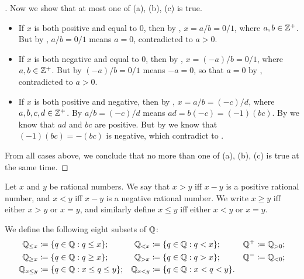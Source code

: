 \begin{proof}[]
  Now we show that at most one of (a), (b), (c) is true.
  \begin{itemize}
    \item If \(x\) is both positive and equal to \(0\), then by , \(x = a / b = 0 / 1\), where \(a, b \in \mathbb{Z}^+\).
          But by , \(a / b = 0 / 1\) means \(a = 0\), contradicted to \(a > 0\).
    \item If \(x\) is both negative and equal to \(0\), then by , \(x = (-a) / b = 0 / 1\), where \(a, b \in \mathbb{Z}^+\).
          But by  \((-a) / b = 0 / 1\) means \(-a = 0\), so that \(a = 0\) by , contradicted to \(a > 0\).
    \item If \(x\) is both positive and negative, then by , \(x = a / b = (-c) / d\), where \(a, b, c, d \in \mathbb{Z}^+\).
          By  \(a / b = (-c) / d\) means \(ad = b(-c) = (-1)(bc)\).
          By  we know that \(ad\) and \(bc\) are positive.
          But by  we know that \((-1)(bc) = -(bc)\) is negative, which contradict to .
  \end{itemize}
  From all cases above, we conclude that no more than one of (a), (b), (c) is true at the same time.
\end{proof}

\begin{defn}\label{i:4.2.8}
  Let \(x\) and \(y\) be rational numbers.
  We say that \(x > y\) iff \(x - y\) is a positive rational number, and \(x < y\) iff \(x - y\) is a negative rational number.
  We write \(x \geq y\) iff either \(x > y\) or \(x = y\), and similarly define \(x \leq y\) iff either \(x < y\) or \(x = y\).

  We define the following eight subsets of \(\mathbb{Q}\):
  \begin{align*}
    \Q_{\leq x}   & \coloneqq \set{q \in \Q : q \leq x};        & \Q_{< x}   & \coloneqq \set{q \in \Q : q < x};     & \Q^+ & \coloneqq \Q_{> 0}; \\
    \Q_{\geq x}   & \coloneqq \set{q \in \Q : q \geq x};        & \Q_{> x}   & \coloneqq \set{q \in \Q : q > x};     & \Q^- & \coloneqq \Q_{< 0}; \\
    \Q_{x \leq y} & \coloneqq \set{q \in \Q : x \leq q \leq y}; & \Q_{x < y} & \coloneqq \set{q \in \Q : x < q < y}. &      &
  \end{align*}
\end{defn}

